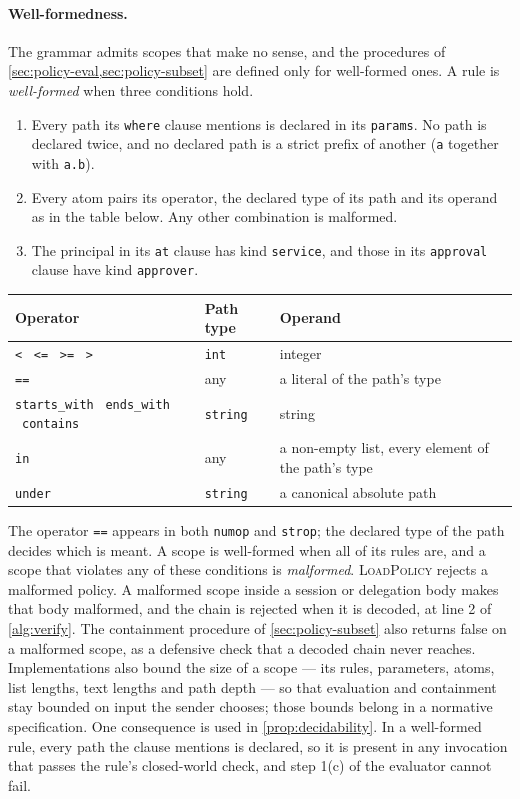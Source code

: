 \documentclass[11pt,a4paper]{article}
\begin{document}
\paragraph{Well-formedness.}
The grammar admits scopes that make no sense, and the procedures of
\cref{sec:policy-eval,sec:policy-subset} are defined only for
well-formed ones. A rule is \emph{well-formed} when three conditions
hold.
\begin{enumerate}
    \item Every path its \texttt{where} clause mentions is declared in
          its \texttt{params}. No path is declared twice, and no
          declared path is a strict prefix of another (\texttt{a}
          together with \texttt{a.b}).
    \item Every atom pairs its operator, the declared type of its path
          and its operand as in the table below. Any other combination
          is malformed.
    \item The principal in its \texttt{at} clause has kind
          \texttt{service}, and those in its \texttt{approval} clause
          have kind \texttt{approver}.
\end{enumerate}
\begin{center}
\small
\begin{tabular}{@{}lll@{}}
\toprule
Operator & Path type & Operand \\
\midrule
\texttt{<} \ \texttt{<=} \ \texttt{>=} \ \texttt{>} & \texttt{int} & integer \\
\texttt{==} & any & a literal of the path's type \\
\texttt{starts\_with} \ \texttt{ends\_with} \ \texttt{contains}
            & \texttt{string} & string \\
\texttt{in} & any & a non-empty list, every element of the path's type \\
\texttt{under} & \texttt{string} & a canonical absolute path \\
\bottomrule
\end{tabular}
\end{center}
The operator \texttt{==} appears in both \texttt{numop} and
\texttt{strop}; the declared type of the path decides which is meant. A
scope is well-formed when all of its rules are, and a scope that
violates any of these conditions is \emph{malformed}.
\textsc{LoadPolicy} rejects a malformed policy. A malformed scope inside
a session or delegation body makes that body malformed, and the chain is
rejected when it is decoded, at line 2 of \cref{alg:verify}. The
containment procedure of \cref{sec:policy-subset} also returns false on a
malformed scope, as a defensive check that a decoded chain never
reaches. Implementations also bound the size of a scope --- its rules,
parameters, atoms, list lengths, text lengths and path depth --- so that
evaluation and containment stay bounded on input the sender chooses;
those bounds belong in a normative specification.
One consequence is used in \cref{prop:decidability}. In a well-formed
rule, every path the clause mentions is declared, so it is present in
any invocation that passes the rule's closed-world check, and step 1(c)
of the evaluator cannot fail.
\end{document}
